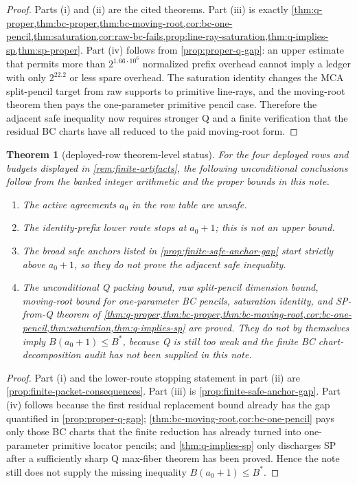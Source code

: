\documentclass[a4paper,11pt]{amsart}
\newtheorem{theorem}{Theorem}[section]
\theoremstyle{remark}
\begin{document}
\begin{proof}
Parts (i) and (ii) are the cited theorems.  Part (iii) is exactly \cref{thm:q-proper,thm:bc-proper,thm:bc-moving-root,cor:bc-one-pencil,thm:saturation,cor:raw-bc-fails,prop:line-ray-saturation,thm:q-implies-sp,thm:sp-proper}.  Part (iv) follows from \cref{prop:proper-q-gap}: an upper estimate that permits more than \(2^{1.66\cdot10^6}\) normalized prefix overhead cannot imply a ledger with only \(2^{22.2}\) or less spare overhead.  The saturation identity changes the MCA split-pencil target from raw supports to primitive line-rays, and the moving-root theorem then pays the one-parameter primitive pencil case.  Therefore the adjacent safe inequality now requires stronger Q and a finite verification that the residual BC charts have all reduced to the paid moving-root form.
\end{proof}

\begin{theorem}[deployed-row theorem-level status]\label{thm:deployed-row-status}
For the four deployed rows and budgets displayed in \cref{rem:finite-artifacts}, the following unconditional conclusions follow from the banked integer arithmetic and the proper bounds in this note.
\begin{enumerate}[label=\textup{(\roman*)}]
\item The active agreements \(a_0\) in the row table are unsafe.
\item The identity-prefix lower route stops at \(a_0+1\); this is not an upper bound.
\item The broad safe anchors listed in \cref{prop:finite-safe-anchor-gap} start strictly above \(a_0+1\), so they do not prove the adjacent safe inequality.
\item The unconditional Q packing bound, raw split-pencil dimension bound, moving-root bound for one-parameter BC pencils, saturation identity, and SP-from-Q theorem of \cref{thm:q-proper,thm:bc-proper,thm:bc-moving-root,cor:bc-one-pencil,thm:saturation,thm:q-implies-sp} are proved.  They do not by themselves imply \(B(a_0+1)\le B^*\), because Q is still too weak and the finite BC chart-decomposition audit has not been supplied in this note.
\end{enumerate}
\end{theorem}

\begin{proof}
Part (i) and the lower-route stopping statement in part (ii) are \cref{prop:finite-packet-consequences}.  Part (iii) is \cref{prop:finite-safe-anchor-gap}.  Part (iv) follows because the first residual replacement bound already has the gap quantified in \cref{prop:proper-q-gap}; \cref{thm:bc-moving-root,cor:bc-one-pencil} pays only those BC charts that the finite reduction has already turned into one-parameter primitive locator pencils; and \cref{thm:q-implies-sp} only discharges SP after a sufficiently sharp Q max-fiber theorem has been proved.  Hence the note still does not supply the missing inequality \(B(a_0+1)\le B^*\).
\end{proof}
\end{document}

